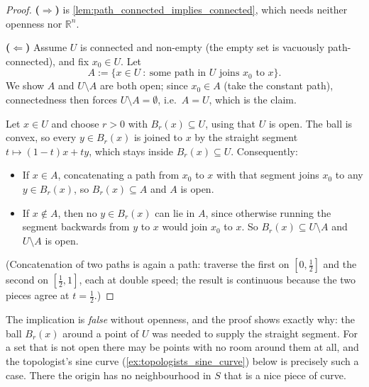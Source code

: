 \begin{proof}
\textbf{($\Rightarrow$)} is \cref{lem:path_connected_implies_connected}, which needs neither
openness nor $\mathbb{R}^n$.

\textbf{($\Leftarrow$)} Assume $U$ is connected and non-empty (the empty set is vacuously
path-connected), and fix $x_0 \in U$. Let
\[A := \{x \in U \ :\ \text{some path in } U \text{ joins } x_0 \text{ to } x\}.\]
We show $A$ and $U \setminus A$ are both open; since $x_0 \in A$ (take the constant path),
connectedness then forces $U\setminus A = \emptyset$, i.e.\ $A = U$, which is the claim.

Let $x \in U$ and choose $r>0$ with $B_r(x) \subseteq U$, using that $U$ is open. The ball is
convex, so every $y \in B_r(x)$ is joined to $x$ by the straight segment
$t \mapsto (1-t)x+ty$, which stays inside $B_r(x) \subseteq U$. Consequently:
\begin{itemize}
  \item If $x \in A$, concatenating a path from $x_0$ to $x$ with that segment joins $x_0$ to
    any $y \in B_r(x)$, so $B_r(x) \subseteq A$ and $A$ is open.
  \item If $x \notin A$, then no $y \in B_r(x)$ can lie in $A$, since otherwise running the
    segment backwards from $y$ to $x$ would join $x_0$ to $x$. So $B_r(x) \subseteq U\setminus A$ and
    $U\setminus A$ is open.
\end{itemize}
(Concatenation of two paths is again a path: traverse the first on $[0,\tfrac12]$ and the second
on $[\tfrac12,1]$, each at double speed; the result is continuous because the two pieces agree
at $t=\tfrac12$.)
\end{proof}

\begin{importantremark}
\label{rem:path_connected_needs_open}
The implication  is \emph{false} without openness,
and the proof shows exactly why: the ball $B_r(x)$ around a point of $U$ was needed to supply
the straight segment. For a set that is not open there may be points with no room around them at
all, and the topologist's sine curve (\cref{ex:topologists_sine_curve}) below is precisely such
a case. There the origin has no neighbourhood in $S$ that is a nice piece of curve.
\end{importantremark}

